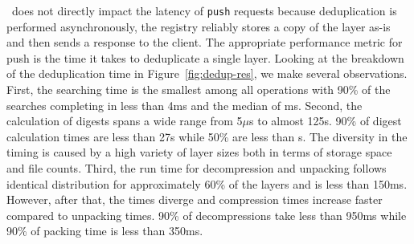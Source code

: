\sysname\ does not directly impact the latency of \texttt{push} requests because
deduplication is performed asynchronously, \ie the registry reliably stores a
copy of the layer as-is and then sends a response to the client.
%
The appropriate performance metric for push is the time it takes to deduplicate
a single layer.
%
%
%
Looking at the breakdown of the deduplication time in
Figure~\ref{fig:dedup-res}, we make several observations.
%
First, the searching time is the smallest among all operations with 90\% of the
searches completing in less than 4ms and the median of ms.
%
%
%
Second, the calculation of digests spans a wide range from 5$\mu$s to almost
125s.
%
%
%
%
90\% of digest calculation times are less than 27s while 50\% are
less than s.
%
The diversity in the timing is caused by a high variety of layer sizes both in
terms of storage space and file counts.
%
%
%
Third, the run time for decompression and unpacking follows identical
distribution for approximately 60\% of the layers and is less than 150ms.
%
%
However, after that, the times diverge and compression times increase faster
compared to unpacking times.
%
%
90\% of decompressions take less than 950ms while 90\% of packing time is less
than 350ms.

